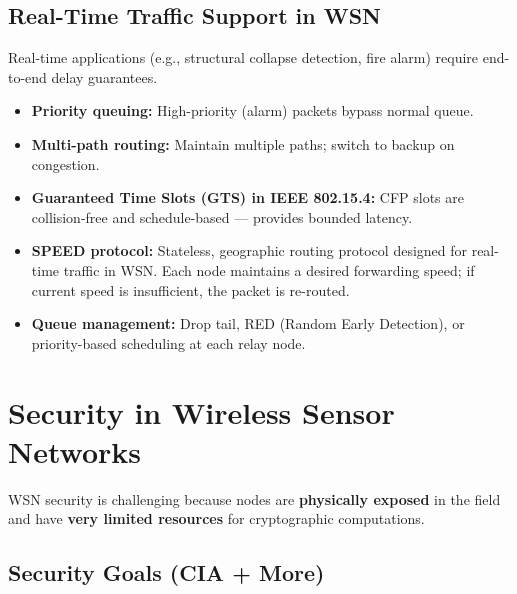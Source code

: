 \documentclass[12pt,a4paper]{article}
\begin{document}
\subsection{Real-Time Traffic Support in WSN}

Real-time applications (e.g., structural collapse detection, fire alarm) require end-to-end delay guarantees.

\begin{itemize}[leftmargin=*, itemsep=3pt]
  \item \textbf{Priority queuing:} High-priority (alarm) packets bypass normal queue.
  \item \textbf{Multi-path routing:} Maintain multiple paths; switch to backup on congestion.
  \item \textbf{Guaranteed Time Slots (GTS) in IEEE 802.15.4:} CFP slots are collision-free and schedule-based --- provides bounded latency.
  \item \textbf{SPEED protocol:} Stateless, geographic routing protocol designed for real-time traffic in WSN. Each node maintains a desired forwarding speed; if current speed is insufficient, the packet is re-routed.
  \item \textbf{Queue management:} Drop tail, RED (Random Early Detection), or priority-based scheduling at each relay node.
\end{itemize}

\section{Security in Wireless Sensor Networks}

WSN security is challenging because nodes are \textbf{physically exposed} in the field and have \textbf{very limited resources} for cryptographic computations.

\subsection{Security Goals (CIA + More)}
\end{document}
